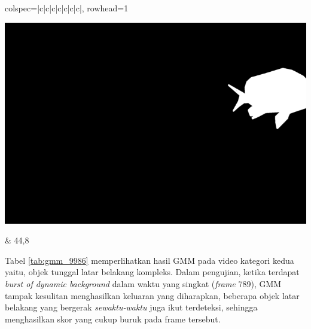 \begin{longtblr}[
            caption = {Hasil ujicoba proses \textit{background subtraction} menggunakan GMM terhadap video indeks 9986},
            label = {tab:gmm_9986}
        ]{
            colspec={|c|c|c|c|c|c|c|},
            rowhead=1
        }
\begin{minipage}{0.24\textwidth}
            	\includegraphics[width=\linewidth]{image/9866/9866_groundtruth_849.png}
            \end{minipage} &
            44,8 \\ \hline
        \end{longtblr}

        Tabel \ref{tab:gmm_9986} memperlihatkan hasil GMM pada video kategori kedua yaitu, objek tunggal latar belakang kompleks. Dalam pengujian, ketika terdapat \textit{burst of dynamic background} dalam waktu yang singkat (\textit{frame} 789), GMM tampak kesulitan menghasilkan keluaran yang diharapkan, beberapa objek latar belakang yang bergerak \textit{sewaktu-waktu} juga ikut terdeteksi, sehingga menghasilkan skor yang cukup buruk pada frame tersebut.

